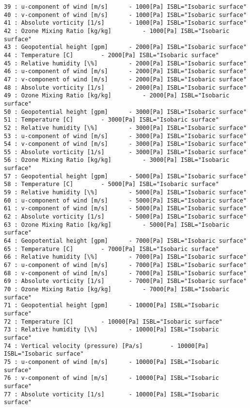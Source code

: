 \documentclass[11pt]{article}
\begin{document}
\begin{Verbatim}[commandchars=\\\{\}]
39 : u-component of wind [m/s] 		- 1000[Pa] ISBL="Isobaric surface"
40 : v-component of wind [m/s] 		- 1000[Pa] ISBL="Isobaric surface"
41 : Absolute vorticity [1/s] 		- 1000[Pa] ISBL="Isobaric surface"
42 : Ozone Mixing Ratio [kg/kg] 		- 1000[Pa] ISBL="Isobaric surface"
43 : Geopotential height [gpm] 		- 2000[Pa] ISBL="Isobaric surface"
44 : Temperature [C] 		- 2000[Pa] ISBL="Isobaric surface"
45 : Relative humidity [\%] 		- 2000[Pa] ISBL="Isobaric surface"
46 : u-component of wind [m/s] 		- 2000[Pa] ISBL="Isobaric surface"
47 : v-component of wind [m/s] 		- 2000[Pa] ISBL="Isobaric surface"
48 : Absolute vorticity [1/s] 		- 2000[Pa] ISBL="Isobaric surface"
49 : Ozone Mixing Ratio [kg/kg] 		- 2000[Pa] ISBL="Isobaric surface"
50 : Geopotential height [gpm] 		- 3000[Pa] ISBL="Isobaric surface"
51 : Temperature [C] 		- 3000[Pa] ISBL="Isobaric surface"
52 : Relative humidity [\%] 		- 3000[Pa] ISBL="Isobaric surface"
53 : u-component of wind [m/s] 		- 3000[Pa] ISBL="Isobaric surface"
54 : v-component of wind [m/s] 		- 3000[Pa] ISBL="Isobaric surface"
55 : Absolute vorticity [1/s] 		- 3000[Pa] ISBL="Isobaric surface"
56 : Ozone Mixing Ratio [kg/kg] 		- 3000[Pa] ISBL="Isobaric surface"
57 : Geopotential height [gpm] 		- 5000[Pa] ISBL="Isobaric surface"
58 : Temperature [C] 		- 5000[Pa] ISBL="Isobaric surface"
59 : Relative humidity [\%] 		- 5000[Pa] ISBL="Isobaric surface"
60 : u-component of wind [m/s] 		- 5000[Pa] ISBL="Isobaric surface"
61 : v-component of wind [m/s] 		- 5000[Pa] ISBL="Isobaric surface"
62 : Absolute vorticity [1/s] 		- 5000[Pa] ISBL="Isobaric surface"
63 : Ozone Mixing Ratio [kg/kg] 		- 5000[Pa] ISBL="Isobaric surface"
64 : Geopotential height [gpm] 		- 7000[Pa] ISBL="Isobaric surface"
65 : Temperature [C] 		- 7000[Pa] ISBL="Isobaric surface"
66 : Relative humidity [\%] 		- 7000[Pa] ISBL="Isobaric surface"
67 : u-component of wind [m/s] 		- 7000[Pa] ISBL="Isobaric surface"
68 : v-component of wind [m/s] 		- 7000[Pa] ISBL="Isobaric surface"
69 : Absolute vorticity [1/s] 		- 7000[Pa] ISBL="Isobaric surface"
70 : Ozone Mixing Ratio [kg/kg] 		- 7000[Pa] ISBL="Isobaric surface"
71 : Geopotential height [gpm] 		- 10000[Pa] ISBL="Isobaric surface"
72 : Temperature [C] 		- 10000[Pa] ISBL="Isobaric surface"
73 : Relative humidity [\%] 		- 10000[Pa] ISBL="Isobaric surface"
74 : Vertical velocity (pressure) [Pa/s] 		- 10000[Pa] ISBL="Isobaric surface"
75 : u-component of wind [m/s] 		- 10000[Pa] ISBL="Isobaric surface"
76 : v-component of wind [m/s] 		- 10000[Pa] ISBL="Isobaric surface"
77 : Absolute vorticity [1/s] 		- 10000[Pa] ISBL="Isobaric surface"

\end{Verbatim}
\end{document}
